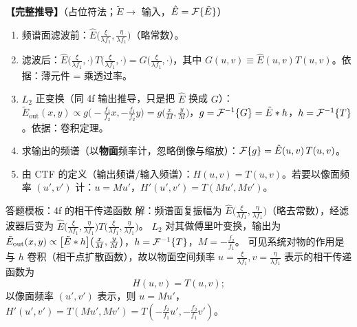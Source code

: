 \textbf{【完整推导】}（占位符法；$\tilde E\to$ 输入，$\hat E=\mathcal{F}\{\tilde E\}$）
\begin{enumerate}
\item 频谱面滤波前：$\hat E\big(\frac{\xi}{\lambda f_1},\frac{\eta}{\lambda f_1}\big)$（略常数）。
\item 滤波后：$\hat E\big(\frac{\xi}{\lambda f_1},\cdot\big)\,T\big(\frac{\xi}{\lambda f_1},\cdot\big)=G\big(\frac{\xi}{\lambda f_1},\cdot\big)$，其中 $G(u,v)\equiv\hat E(u,v)T(u,v)$。\quad 依据：薄元件 = 乘透过率。
\item $L_2$ 正变换（同 4f 输出推导，只是把 $\hat E$ 换成 $G$）：$\tilde E_{\text{out}}(x,y)\propto g\big(-\frac{f_1}{f_2}x,-\frac{f_1}{f_2}y\big)=g\big(\frac xM,\frac yM\big)$，$g=\mathcal{F}^{-1}\{G\}=\tilde E\ast h$，$h=\mathcal{F}^{-1}\{T\}$。\quad 依据：卷积定理。
\item 求输出的频谱（以\textbf{物面}频率计，忽略倒像与缩放）：$\mathcal{F}\{g\}=\hat E(u,v)\,T(u,v)$。
\item 由 CTF 的定义（输出频谱/输入频谱）：$\boxed{H(u,v)=T(u,v)}$。若要以像面频率 $(u',v')$ 计：$u=Mu'$，$H'(u',v')=T(Mu',Mv')$。
\end{enumerate}

\begin{exam}{答题模板：4f 的相干传递函数}
解：频谱面复振幅为 $\hat E\big(\frac{\xi}{\lambda f_1},\frac{\eta}{\lambda f_1}\big)$（略去常数），经滤波器后变为
$\hat E\big(\frac{\xi}{\lambda f_1},\frac{\eta}{\lambda f_1}\big)T\big(\frac{\xi}{\lambda f_1},\frac{\eta}{\lambda f_1}\big)$。
$L_2$ 对其做傅里叶变换，输出为 $\tilde E_{\text{out}}(x,y)\propto\big[\tilde E\ast h\big]\big(\frac xM,\frac yM\big)$，$h=\mathcal{F}^{-1}\{T\}$，$M=-\frac{f_2}{f_1}$。
可见系统对物的作用是与 $h$ 卷积（相干点扩散函数），故以物面空间频率 $u=\frac{\xi}{\lambda f_1},v=\frac{\eta}{\lambda f_1}$ 表示的相干传递函数为
\[
H(u,v)=T(u,v);
\]
以像面频率 $(u',v')$ 表示，则 $u=Mu'$，$H'(u',v')=T(Mu',Mv')=T\!\left(-\frac{f_2}{f_1}u',-\frac{f_2}{f_1}v'\right)$。
\end{exam}

